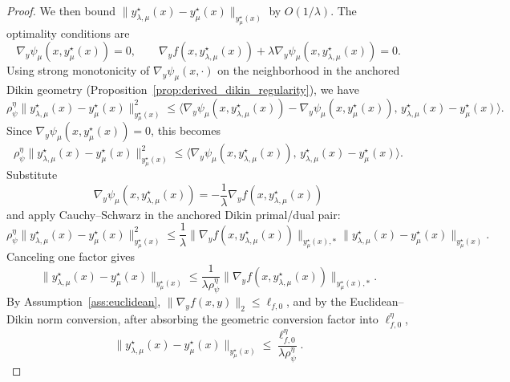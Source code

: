 \documentclass{article}
\begin{document}
\begin{proof}
\smallskip
\noindent We then bound
\(\|y_{\lambda,\mu}^\star(x)-y_\mu^\star(x)\|_{y_\mu^\star(x)}\) by \(O(1/\lambda)\).
The optimality conditions are
\[
\nabla_y\psi_\mu(x,y_\mu^\star(x))=0,
\qquad
\nabla_y f(x,y_{\lambda,\mu}^\star(x))
+
\lambda\nabla_y\psi_\mu(x,y_{\lambda,\mu}^\star(x))=0.
\]
Using strong monotonicity of \(\nabla_y\psi_\mu(x,\cdot)\) on the neighborhood in the anchored Dikin geometry
(Proposition~\ref{prop:derived_dikin_regularity}), we have
\[
\rho_\psi^\eta
\|y_{\lambda,\mu}^\star(x)-y_\mu^\star(x)\|_{y_\mu^\star(x)}^2
\le
\big\langle
\nabla_y\psi_\mu(x,y_{\lambda,\mu}^\star(x))
-
\nabla_y\psi_\mu(x,y_\mu^\star(x)),
\,y_{\lambda,\mu}^\star(x)-y_\mu^\star(x)
\big\rangle.
\]
Since \(\nabla_y\psi_\mu(x,y_\mu^\star(x))=0\), this becomes
\[
\rho_\psi^\eta
\|y_{\lambda,\mu}^\star(x)-y_\mu^\star(x)\|_{y_\mu^\star(x)}^2
\le
\big\langle
\nabla_y\psi_\mu(x,y_{\lambda,\mu}^\star(x)),
\,y_{\lambda,\mu}^\star(x)-y_\mu^\star(x)
\big\rangle.
\]
Substitute
\[
\nabla_y\psi_\mu(x,y_{\lambda,\mu}^\star(x))
=
-\frac{1}{\lambda}\nabla_y f(x,y_{\lambda,\mu}^\star(x))
\]
and apply Cauchy--Schwarz in the anchored Dikin primal/dual pair:
\[
\rho_\psi^\eta
\|y_{\lambda,\mu}^\star(x)-y_\mu^\star(x)\|_{y_\mu^\star(x)}^2
\le
\frac{1}{\lambda}
\|\nabla_y f(x,y_{\lambda,\mu}^\star(x))\|_{y_\mu^\star(x),*}
\|y_{\lambda,\mu}^\star(x)-y_\mu^\star(x)\|_{y_\mu^\star(x)}.
\]
Canceling one factor gives
\[
\|y_{\lambda,\mu}^\star(x)-y_\mu^\star(x)\|_{y_\mu^\star(x)}
\le
\frac{1}{\lambda\rho_\psi^\eta}
\|\nabla_y f(x,y_{\lambda,\mu}^\star(x))\|_{y_\mu^\star(x),*}.
\]
By Assumption~\ref{ass:euclidean}, \(\|\nabla_y f(x,y)\|_2\le \ell_{f,0}\), and by the
Euclidean--Dikin norm conversion, after absorbing the geometric conversion factor into
\(\ell_{f,0}^\eta\),
\begin{equation}
\label{eq:proxy_center_bias_rate}
\|y_{\lambda,\mu}^\star(x)-y_\mu^\star(x)\|_{y_\mu^\star(x)}
\le
\frac{\ell_{f,0}^\eta}{\lambda\rho_\psi^\eta}.
\end{equation}


\end{proof}
\end{document}
